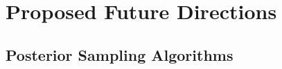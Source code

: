 \documentclass[9pt]{beamer}
\begin{document}
%
%
%
%
%
%
%
%
%


\section{Proposed Future Directions}


\subsection{Posterior Sampling Algorithms}
\end{document}
